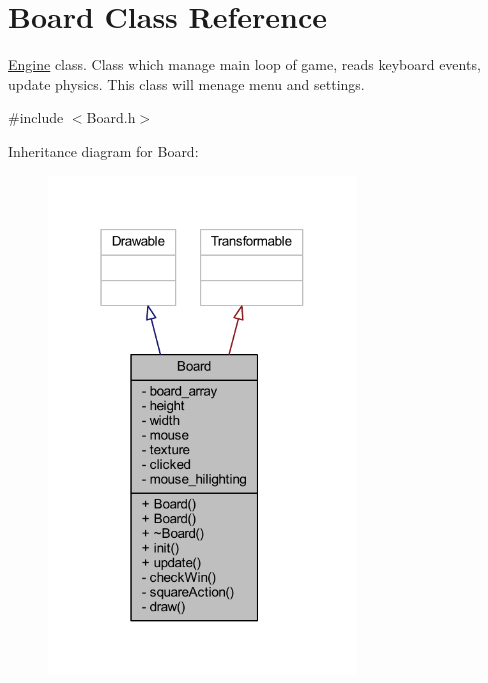 \hypertarget{class_board}{}\section{Board Class Reference}
\label{class_board}


\hyperlink{class_engine}{Engine} class. Class which manage main loop of game, reads keyboard events, update physics. This class will menage menu and settings.  




{\ttfamily \#include $<$Board.\+h$>$}



Inheritance diagram for Board\+:
\nopagebreak
\begin{figure}[H]
\begin{center}
\leavevmode
\includegraphics[width=232pt]{class_board__inherit__graph}
\end{center}
\end{figure}


